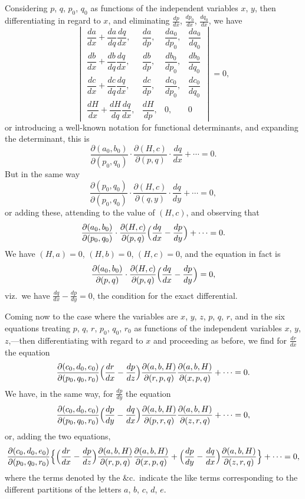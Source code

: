 \documentclass[11pt,a4paper]{article}
\theoremstyle{plain}
\theoremstyle{definition}
\begin{document}
Considering $p$, $q$, $p_0$, $q_0$ as functions of the independent variables $x$, $y$, then differentiating in regard to $x$, and eliminating $\frac{dp}{dx}$, $\frac{dp_0}{dx}$, $\frac{dq_0}{dx}$, we have
\[
\begin{vmatrix}
\dfrac{da}{dx} + \dfrac{da}{dq}\dfrac{dq}{dx}, & \dfrac{da}{dp}, & \dfrac{da_0}{dp_0}, & \dfrac{da_0}{dq_0} \\[6pt]
\dfrac{db}{dx} + \dfrac{db}{dq}\dfrac{dq}{dx}, & \dfrac{db}{dp}, & \dfrac{db_0}{dp_0}, & \dfrac{db_0}{dq_0} \\[6pt]
\dfrac{dc}{dx} + \dfrac{dc}{dq}\dfrac{dq}{dx}, & \dfrac{dc}{dp}, & \dfrac{dc_0}{dp_0}, & \dfrac{dc_0}{dq_0} \\[6pt]
\dfrac{dH}{dx} + \dfrac{dH}{dq}\dfrac{dq}{dx}, & \dfrac{dH}{dp}, & 0, & 0
\end{vmatrix} = 0,
\]
or introducing a well-known notation for functional determinants, and expanding the determinant, this is
\[
\frac{\partial(a_0, b_0)}{\partial(p_0, q_0)} \cdot \frac{\partial(H, c)}{\partial(p, q)} \cdot \frac{dq}{dx} + \cdots = 0.
\]
But in the same way
\[
\frac{\partial(p_0, q_0)}{\partial(p_0, q_0)} \cdot \frac{\partial(H, c)}{\partial(q, y)} \cdot \frac{dq}{dy} + \cdots = 0,
\]
or adding these, attending to the value of $(H, c)$, and observing that
\[
\frac{\partial(a_0, b_0)}{\partial(p_0, q_0)} \cdot \frac{\partial(H, c)}{\partial(p, q)} \Bigl(\frac{dq}{dx} - \frac{dp}{dy}\Bigr) + \cdots = 0.
\]
We have $(H, a) = 0$, $(H, b) = 0$, $(H, c) = 0$, and the equation in fact is
\[
\frac{\partial(a_0, b_0)}{\partial(p, q)} \cdot \frac{\partial(H, c)}{\partial(p, q)} \Bigl(\frac{dq}{dx} - \frac{dp}{dy}\Bigr) = 0,
\]
viz.~we have $\frac{dq}{dx} - \frac{dp}{dy} = 0$, the condition for the exact differential.

Coming now to the case where the variables are $x$, $y$, $z$, $p$, $q$, $r$, and in the six equations treating $p$, $q$, $r$, $p_0$, $q_0$, $r_0$ as functions of the independent variables $x$, $y$, $z$,---then differentiating with regard to $x$ and proceeding as before, we find for $\frac{dr}{dx}$ the equation
\[
\frac{\partial(c_0, d_0, e_0)}{\partial(p_0, q_0, r_0)} \Bigl(\frac{dr}{dx} - \frac{dp}{dz}\Bigr) \frac{\partial(a, b, H)}{\partial(r, p, q)} \frac{\partial(a, b, H)}{\partial(x, p, q)} + \cdots = 0.
\]
We have, in the same way, for $\frac{dp}{dy}$ the equation
\[
\frac{\partial(c_0, d_0, e_0)}{\partial(p_0, q_0, r_0)} \Bigl(\frac{dp}{dy} - \frac{dq}{dx}\Bigr) \frac{\partial(a, b, H)}{\partial(p, r, q)} \frac{\partial(a, b, H)}{\partial(z, r, q)} + \cdots = 0,
\]
or, adding the two equations,
\[
\frac{\partial(c_0, d_0, e_0)}{\partial(p_0, q_0, r_0)} \Bigl\{\Bigl(\frac{dr}{dx} - \frac{dp}{dz}\Bigr) \frac{\partial(a, b, H)}{\partial(r, p, q)} \frac{\partial(a, b, H)}{\partial(x, p, q)} + \Bigl(\frac{dp}{dy} - \frac{dq}{dx}\Bigr) \frac{\partial(a, b, H)}{\partial(z, r, q)}\Bigr\} + \cdots = 0,
\]
where the terms denoted by the \&c.~indicate the like terms corresponding to the different partitions of the letters $a$, $b$, $c$, $d$, $e$.
\end{document}

